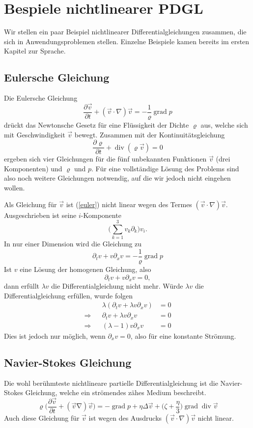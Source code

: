 %
%
%
\section{Bespiele nichtlinearer PDGL}
Wir stellen ein paar Beispiel nichtlinearer Differentialgleichungen
zusammen, die sich in Anwendungsproblemen stellen. Einzelne Beispiele
kamen bereits im ersten Kapitel zur Sprache.

\subsection{Eulersche Gleichung}
Die Eulersche Gleichung
\begin{equation}
\frac{\partial \vec v}{\partial t}+(\vec v\cdot\nabla)\vec v=-\frac1\varrho\operatorname{grad}p
\label{euler}
\end{equation}
drückt das Newtonsche Gesetz für eine Flüssigkeit der Dichte $\varrho$ aus,
welche sich mit Geschwindigkeit $\vec v$ bewegt.
Zusammen mit der Kontinuitätsgleichung
\[
\frac{\partial\varrho}{\partial t}+\operatorname{div}(\varrho \vec v)=0
\]
ergeben sich vier Gleichungen für die fünf unbekannten Funktionen
$\vec v$ (drei Komponenten) und $\varrho$ und $p$. Für eine vollständige
Lösung des Problems sind also noch weitere Gleichungen notwendig, auf die
wir jedoch nicht eingehen wollen.

Als Gleichung für $\vec v$ ist (\ref{euler}) nicht linear wegen des Termes
$(\vec v\cdot \nabla)\vec v$. Ausgeschrieben ist seine $i$-Komponente
\[
\biggl(\sum_{k=1}^3v_k\partial_k\biggr)v_i.
\]
In nur einer Dimension wird die Gleichung zu
\[
\partial_tv+v\partial_xv=-\frac1\varrho\operatorname{grad}p
\]
Ist $v$ eine Lösung der homogenen Gleichung, also
\[
\partial_t v+v\partial_x v=0,
\]
dann erfüllt $\lambda v$ die Differentialgleichung nicht mehr. Würde
$\lambda v$ die Differentialgleichung erfüllen, wurde folgen
\begin{align*}
&&\lambda(\partial_t v+\lambda v\partial_xv)&=0
\\
\Rightarrow
&&
\partial_t v+\lambda v\partial_xv&=0
\\
\Rightarrow
&&
(\lambda -1)v\partial_xv&=0
\end{align*}
Dies ist jedoch nur möglich, wenn $\partial_xv=0$, also für eine
konstante Strömung.

\subsection{Navier-Stokes Gleichung}
Die wohl berühmteste nichtlineare partielle Differentialgleichung ist
die Navier-Stokes Gleichung, welche ein strömendes zähes Medium beschreibt.
\[
\varrho\biggl(
\frac{\partial \vec v}{\partial t}+(\vec v\operatorname \nabla)\vec v
\biggr)
=
-\operatorname{grad}p
+\eta\Delta \vec v+\biggl(\zeta+\frac{\eta}3\biggr)\operatorname{grad}\operatorname{div}\vec v
\]
Auch diese Gleichung für $\vec v$ ist wegen des Ausdrucks $(\vec v\cdot\nabla)\vec v$
nicht linear.

